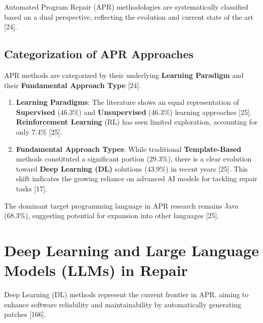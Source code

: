 Automated Program Repair (APR) methodologies are systematically classified based on a dual perspective, reflecting the evolution and current state of the art [24].

\subsection{Categorization of APR Approaches}
APR methods are categorized by their underlying \textbf{Learning Paradigm} and their \textbf{Fundamental Approach Type} [24].

\begin{enumerate}
    \item \textbf{Learning Paradigms}: The literature shows an equal representation of \textbf{Supervised} (46.3\%) and \textbf{Unsupervised} (46.3\%) learning approaches [25]. \textbf{Reinforcement Learning} (RL) has seen limited exploration, accounting for only 7.4\% [25].
    \item \textbf{Fundamental Approach Types}: While traditional \textbf{Template-Based} methods constituted a significant portion (29.3\%), there is a clear evolution toward \textbf{Deep Learning (DL)} solutions (43.9\%) in recent years [25]. This shift indicates the growing reliance on advanced AI models for tackling repair tasks [17].
\end{enumerate}
The dominant target programming language in APR research remains Java (68.3\%), suggesting potential for expansion into other languages [25].

\section{Deep Learning and Large Language Models (LLMs) in Repair}

Deep Learning (DL) methods represent the current frontier in APR, aiming to enhance software reliability and maintainability by automatically generating patches [166].

